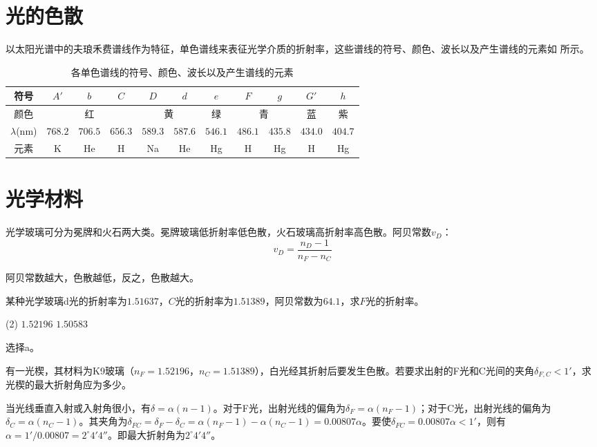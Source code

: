 \documentclass[cn,10pt,chinesefont=founder,math=newtx,cite=super,twoside]{elegantbook}
\begin{document}
\section{光的色散}
以太阳光谱中的夫琅禾费谱线作为特征，单色谱线来表征光学介质的折射率，这些谱线的符号、颜色、波长以及产生谱线的元素如 所示。

\begin{table}[htbp]
	\small
	\centering
	\caption{各单色谱线的符号、颜色、波长以及产生谱线的元素}
	\begin{tabular}{c|c|c|c|c|c|c|c|c|c|c}
		\hline
		符号&$A'$&$b$&$C$&$D$&$d$&$e$&$F$&$g$&$G'$&$h$\\
		\hline
		颜色&\multicolumn{3}{c|}{红}&\multicolumn{2}{c|}{黄}&绿&\multicolumn{2}{c|}{青}&蓝&紫\\
		\hline
		$\lambda$(nm)&$768.2$&$706.5$&$656.3$&$589.3$&$587.6$&$546.1$&$486.1$&$435.8$&$434.0$&$404.7$\\
		\hline
		元素&K&He&H&Na&He&Hg&H&Hg&H&Hg\\
		\hline
	\end{tabular}
	\label{tab:spectral-line}
\end{table}

\section{光学材料}
\label{sect:optical-material}
光学玻璃可分为冕牌和火石两大类。冕牌玻璃低折射率低色散，火石玻璃高折射率高色散。阿贝常数$v_D$：
\begin{equation}
v_D=\frac{n_D-1}{n_F-n_C}
\end{equation}

\begin{property}
	阿贝常数越大，色散越低，反之，色散越大。
\end{property}

\begin{problem}
	某种光学玻璃d光的折射率为$1.51637$，$C$光的折射率为$1.51389$，阿贝常数为$64.1$，求$F$光的折射率。
	\begin{tasks}(2)
		\task $1.52196$
		\task $1.50583$
	\end{tasks}
\end{problem}
\begin{solution}
	选择a。
\end{solution}

\begin{problem}
	有一光楔，其材料为K9玻璃（$n_F=1.52196$，$n_C=1.51389$），白光经其折射后要发生色散。若要求出射的F光和C光间的夹角$\delta_{F,C}<1'$，求光楔的最大折射角应为多少。
\end{problem}
\begin{solution}
	当光线垂直入射或入射角很小，有$\delta=\alpha(n-1)$。对于F光，出射光线的偏角为$\delta_F=\alpha(n_F-1)$；对于C光，出射光线的偏角为$\delta_C=\alpha(n_C-1)$。其夹角为$\delta_{FC}=\delta_F-\delta_C=\alpha(n_F-1)-\alpha(n_C-1)=0.00807\alpha$。要使$\delta_{FC}=0.00807\alpha<1'$，则有$\alpha=1'/0.00807=2^{\circ}4'4''$。即最大折射角为$2^{\circ}4'4''$。
\end{solution}
\end{document}
